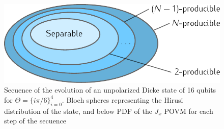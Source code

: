 \begin{figure}
  \centering
  \includegraphics[scale=.85]{img/separability-k-producibility-circle.pdf}
  \caption{Secuence of the evolution of an unpolarized Dicke state of 16 qubits for $\Theta=\{i\pi/6\}_{i=0}^4$. Bloch spheres representing the Hirusi distribution of the state, and below PDF of the $J_x$ POVM for each step of the secuence}
  \label{fig:bg-separability-k-producibility-circle}
\end{figure}

\be
  \label{eq:bg-pezze-bound}
  \qfi[\rho,J_z] \geq {}
\ee
